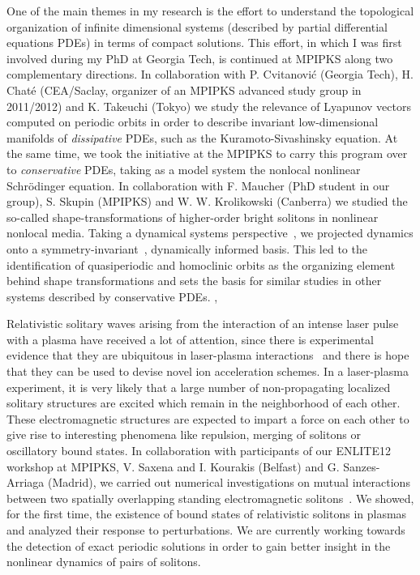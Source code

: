 \documentclass[11pt,a4paper,final]{moderncv}
\begin{document}
One of the main themes in my research is the effort to understand the topological organization of 
infinite dimensional systems (described by partial differential equations PDEs) in terms of compact solutions.
This effort, in which I was first involved during my PhD at Georgia Tech, is continued at MPIPKS along two complementary
directions. In collaboration with P. Cvitanovi\'c (Georgia Tech), H. Chat\'e (CEA/Saclay, organizer of
an MPIPKS advanced study group in 2011/2012) and K. Takeuchi (Tokyo) we study the relevance of
Lyapunov vectors computed on periodic orbits in order to describe invariant low-dimensional manifolds
of \emph{dissipative} PDEs, such as the Kuramoto-Sivashinsky equation. At the same time, we took the initiative
at the MPIPKS to carry this program over to \emph{conservative} PDEs, taking as a model system the nonlocal nonlinear
Schr\"odinger equation. In collaboration with F. Maucher (PhD student in our group), S. Skupin (MPIPKS) and W. W. Krolikowski (Canberra)
we studied the so-called shape-transformations of higher-order bright solitons in nonlinear nonlocal media.
Taking a dynamical systems perspective~\cite{maucher2013}, we projected dynamics onto a symmetry-invariant~\cite{SiCvi10, atlas12},
dynamically informed basis. This led to the identification of quasiperiodic and homoclinic orbits 
as the organizing element behind shape transformations and sets the basis for similar studies in other systems
described by conservative PDEs.
\sep

Relativistic solitary waves arising from the interaction of an intense laser pulse with a plasma have received
a lot of attention, since there is experimental evidence that they are ubiquitous in laser-plasma interactions~\cite{borghesi02,sarri10}
and there is hope that they can be used to devise novel ion acceleration schemes.
In a laser-plasma experiment, it is very likely that a large number of non-propagating 
localized solitary structures are excited which remain in the neighborhood of each other. 
These electromagnetic structures are expected to impart a force on each other
to give rise to interesting phenomena like repulsion, merging of
solitons or oscillatory bound states. 
In collaboration with participants of our ENLITE12 workshop at MPIPKS, V. Saxena and I. Kourakis (Belfast) 
and G. Sanzes-Arriaga (Madrid), we carried out numerical investigations on mutual 
interactions between two spatially overlapping standing 
electromagnetic solitons~\cite{saxena2013}.
We showed, for the first time, the existence of bound states of relativistic solitons in plasmas and analyzed their 
response to perturbations. We are currently working towards the detection of
exact periodic solutions in order to gain better insight in the nonlinear dynamics of pairs of solitons.
\end{document}
